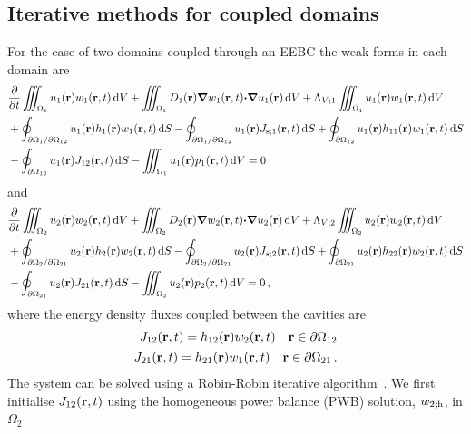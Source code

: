 \documentclass[a4paper]{article}
\numberwithin{equation}{section}
\providecommand\oiint{\oint}
\begin{document}
\subsection[Iterative methods for coupled domains]{Iterative methods for coupled domains}
\label{sc:fem:coup}

For the case of two domains coupled through an EEBC the weak forms in each domain are
\begin{align}
\label{eq:wf:coup1}
&\frac{{\partial}}{{\partial}t}\iiint_{\Omega_1} u_1\pr w_1\prt\dif{V}
+\iiint_{\Omega_1} D_1\pr{\vnabla}w_1\prt{\vcdot}{\vnabla}u_1\pr\dif{V}
+\Lambda_{V;1}\iiint_{\Omega_1} u_1\pr w_1\prt\dif{V} \nonumber\\
&+\oiint_{\partial\Omega_1/\partial\Omega_{12}} u_1\pr h_1\pr w_1\prt\dif{S}
-\oiint_{\partial\Omega_1/\partial\Omega_{12}} u_1\pr J_{\rs;1}\prt\dif{S}
+\oiint_{\partial\Omega_{12}} u_1\pr h_{11}\pr w_1\prt\dif{S} \nonumber \\
&-\oiint_{\partial\Omega_{12}} u_1\pr J_{12}\prt\dif{S}
-\iiint_{\Omega_1} u_1\pr p_1\prt\dif{V}=0
\end{align}
and
\begin{align}
\label{eq:wf:coup2}
&\frac{{\partial}}{{\partial}t}\iiint_{\Omega_2} u_2\pr w_2\prt\dif{V}
+\iiint_{\Omega_2} D_2\pr{\vnabla}w_2\prt{\vcdot}{\vnabla}u_2\pr\dif{V}
+\Lambda_{V;2}\iiint_{\Omega_2} u_2\pr w_2\prt\dif{V} \nonumber\\
&+\oiint_{\partial\Omega_2/\partial\Omega_{21}} u_2\pr h_2\pr w_2\prt\dif{S}
-\oiint_{\partial\Omega_2/\partial\Omega_{21}} u_2\pr J_{s;2}\prt\dif{S}
+\oiint_{\partial\Omega_{21}} u_2\pr h_{22}\pr w_2\prt\dif{S} \nonumber\\
&-\oiint_{\partial\Omega_{21}} u_2\pr J_{21}\prt\dif{S}
-\iiint_{\Omega_2} u_2\pr p_2\prt\dif{V}=0\,,
\end{align}
where the energy density fluxes coupled between the cavities are
\begin{align}
\label{eq:wf:coup:J12}
\begin{matrix}
J_{12}(\boldsymbol{\mathrm{r}},t) = h_{12}(\boldsymbol{\mathrm{r}}) w_2(\boldsymbol{\mathrm{r}},t) &\boldsymbol{\mathrm{r}}\in\partial\Omega_{12} 
\end{matrix}\\
\label{eq:wf:coup:J21}
\begin{matrix}
J_{21}(\boldsymbol{\mathrm{r}},t) = h_{21}(\boldsymbol{\mathrm{r}}) w_1(\boldsymbol{\mathrm{r}},t) &\boldsymbol{\mathrm{r}}\in\partial\Omega_{21}
\end{matrix}\,.
\end{align}
The system can be solved using a Robin-Robin iterative algorithm~\citep{Discacciati2007}. We first initialise
$J_{12}(\boldsymbol{\mathrm{r}},t)$ using the homogeneous power balance (PWB) solution, $w_{2;\mathrm{h}}$,  in $\Omega_2$
\end{document}
